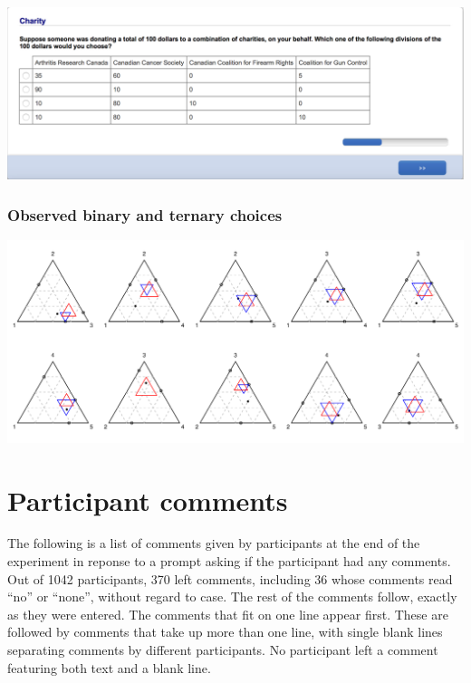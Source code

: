 \documentclass[11pt,letter]{article}
\begin{document}
\includegraphics[width=15cm]{Population_study_design/screenshot_Charity.png}

\subsubsection*{Observed binary and ternary choices}

\includegraphics[width=15cm]{./Population_study_data/Simplexes/Charity.pdf}

\pagebreak

\section{Participant comments}

The following is a list of comments given by participants at the end of the experiment in reponse to a prompt asking if the participant had any comments.
Out of 1042 participants, 370 left comments, including 36 whose comments read ``no'' or ``none'', without regard to case.
The rest of the comments follow, exactly as they were entered.
The comments that fit on one line appear first.
These are followed by comments that take up more than one line, with single blank lines separating comments by different participants.
No participant left a comment featuring both text and a blank line.

\begin{small}



\end{small}




\end{document}
